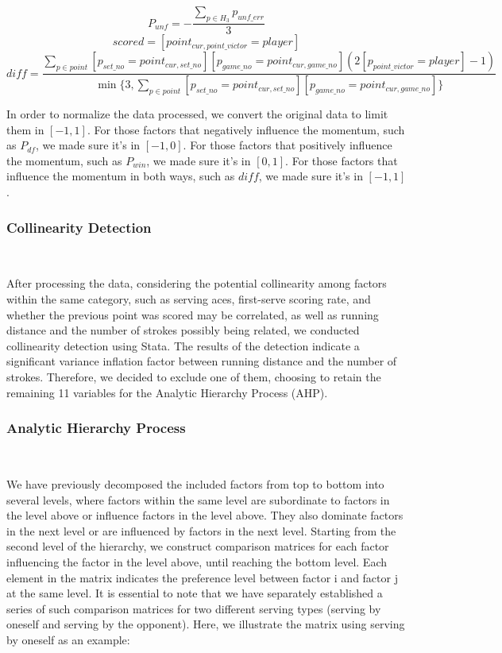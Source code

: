 \begin{equation}
    P_{unf} = -\frac{\sum_{p \in H_3} p_{unf\_err}}{3}
\end{equation}
\begin{equation}
    scored = [point_{cur, point\_victor} = player]
\end{equation}
\begin{equation}
    diff = \frac{\sum_{p \in point}[p_{set\_no} = point_{cur, set\_no}][p_{game\_no} = point_{cur, game\_no}](2[p_{point\_victor} = player]-1)}{\min\{3, \sum_{p \in point}[p_{set\_no} = point_{cur, set\_no}][p_{game\_no} = point_{cur, game\_no}]\}}
\end{equation}
\par In order to normalize the data processed, we convert the original data to limit them in $[-1, 1]$. 
For those factors that negatively influence the momentum, such as $P_{df}$, we made sure it's in $[-1, 0]$. For those factors that positively influence the momentum, such as $P_{win}$, we made sure it's in $[0, 1]$. For those factors that influence the momentum in both ways, such as $diff$, we made sure it's in $[-1, 1]$.

\subsubsection{Collinearity Detection}~{}

After processing the data, considering the potential collinearity among factors within the same category,
such as serving aces, first-serve scoring rate, and whether the previous point was scored may 
be correlated, as well as running distance and the number of strokes possibly being related, 
we conducted collinearity detection using Stata. The results of the detection indicate a
significant variance inflation factor between running distance and the number of strokes. 
Therefore, we decided to exclude one of them, choosing to retain the remaining 11 variables 
for the Analytic Hierarchy Process (AHP).

\subsubsection{Analytic Hierarchy Process}~{}

We have previously decomposed the included factors from top to bottom into several levels, 
where factors within the same level are subordinate to factors in the level above or influence 
factors in the level above. They also dominate factors in the next level or are influenced by 
factors in the next level. Starting from the second level of the hierarchy, we construct 
comparison matrices for each factor influencing the factor in the level above, until reaching 
the bottom level. Each element in the matrix indicates the preference level between factor i and 
factor j at the same level. It is essential to note that we have separately established a series 
of such comparison matrices for two different serving types (serving by oneself and serving by 
the opponent). Here, we illustrate the matrix using serving by oneself as an example:

